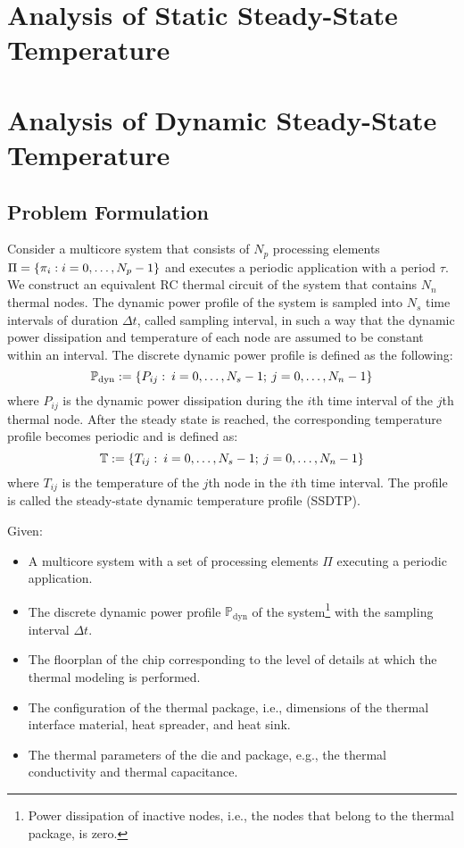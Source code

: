 \section{Analysis of Static Steady-State Temperature}

\section{Analysis of Dynamic Steady-State Temperature}

\subsection{Problem Formulation}

Consider a multicore system that consists of $N_p$ processing elements $\Pi = \{
\pi_i: i = 0, \dots, N_p - 1 \}$ and executes a periodic application with a
period $\tau$. We construct an equivalent RC thermal circuit of the system that
contains $N_n$ thermal nodes. The dynamic power profile of the system is sampled
into $N_s$ time intervals of duration $\Delta t$, called sampling interval, in
such a way that the dynamic power dissipation and temperature of each node are
assumed to be constant within an interval. The discrete dynamic power profile is
defined as the following:
\[
  \mathbb{P}_{\mathrm{dyn}} := \{ P_{ij}: \: i = 0, \dots, N_s - 1; \: j = 0, \dots, N_n - 1 \}
\]
where $P_{ij}$ is the dynamic power dissipation during the $i$th time interval
of the $j$th thermal node. After the steady state is reached, the corresponding
temperature profile becomes periodic and is defined as:
\[
  \mathbb{T} := \{ T_{ij}: \: i = 0, \dots, N_s - 1; \: j = 0, \dots, N_n - 1 \}
\]
where $T_{ij}$ is the temperature of the $j$th node in the $i$th time interval.
The profile is called the steady-state dynamic temperature profile (SSDTP).

Given:
\begin{itemize}

\item A multicore system with a set of processing elements $\Pi$ executing a
periodic application.

\item The discrete dynamic power profile $\mathbb{P}_\text{dyn}$ of the
system\footnote{Power dissipation of inactive nodes, i.e., the nodes that belong
to the thermal package, is zero.} with the sampling interval $\Delta t$.

\item The floorplan of the chip corresponding to the level of details at which
the thermal modeling is performed.

\item The configuration of the thermal package, i.e., dimensions of the thermal
interface material, heat spreader, and heat sink.

\item The thermal parameters of the die and package, e.g., the thermal
conductivity and thermal capacitance.

\end{itemize}

